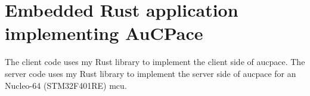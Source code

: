 \chapter{Embedded Rust application implementing AuCPace}
\label{chap:appendix-aucpace-embedded}

The client code uses my Rust library to implement the client side of \gls{aucpace}.
The server code uses my Rust library to implement the server side of \gls{aucpace} for an Nucleo-64 (STM32F401RE) \gls{mcu}.

